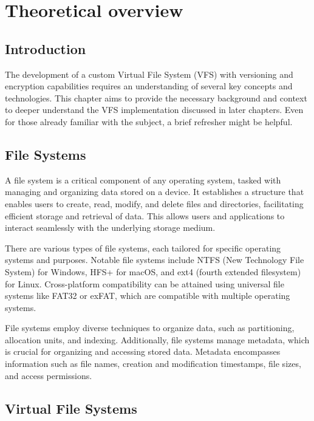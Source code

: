 \chapter{Theoretical overview}
\label{chap:refs}

\section{Introduction}\label{sec:introduction}

The development of a custom Virtual File System (VFS) with versioning and encryption capabilities requires an understanding of several key concepts and technologies.
This chapter aims to provide the necessary background and context to deeper understand the VFS implementation discussed in later chapters.
Even for those already familiar with the subject, a brief refresher might be helpful.

\section{File Systems}\label{sec:file-systems}

A file system is a critical component of any operating system, tasked with managing and organizing data stored on a device.
It establishes a structure that enables users to create, read, modify, and delete files and directories, facilitating efficient storage and retrieval of data.
This allows users and applications to interact seamlessly with the underlying storage medium.

There are various types of file systems, each tailored for specific operating systems and purposes.
Notable file systems include NTFS (New Technology File System) for Windows, HFS+ for macOS, and ext4 (fourth extended filesystem) for Linux.
Cross-platform compatibility can be attained using universal file systems like FAT32 or exFAT, which are compatible with multiple operating systems.

File systems employ diverse techniques to organize data, such as partitioning, allocation units, and indexing.
Additionally, file systems manage metadata, which is crucial for organizing and accessing stored data.
Metadata encompasses information such as file names, creation and modification timestamps, file sizes, and access permissions.

\section{Virtual File Systems}\label{sec:virtual-file-systems}


